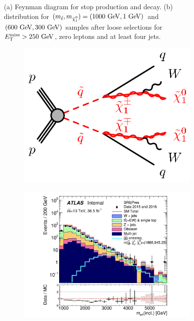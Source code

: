 \begin{figure}[h!]
\begin{center}
\begin{subfigure}[b]{0.45\textwidth}
                \caption{ }
    \end{subfigure}
\end{center}
\caption[Stop signal with $m_{\stop}-m_{\ninoone} >> m_t$ and SM background $\mtbmax$ distribution after loose preliminary selections for $\met>250 \gev$, zero leptons and at least four jets]{ (a) Feynman diagram for stop production and decay. (b) \mtbmax distribution for $(m_{\stop}, m_{\ninoone}) = (1000 \gev,1 \gev)$ and $(600 \gev, 300 \gev)$ samples after loose selections for $\met>250 \gev$, zero leptons and at least four jets.\cite{stop0LCONF} }
\label{fig:stopMtbmin} 
\end{figure}

\begin{figure}[h!]
  \begin{center}
    \begin{subfigure}[b]{0.30\textwidth}
        \includegraphics[width=\textwidth]{figures/feynDiag/gluino_onestep.png}%
                \caption{ }
    \end{subfigure}
    \begin{subfigure}[b]{0.45\textwidth}
        \includegraphics[width=\textwidth]{figures/strategy/gluino_meff.png}

\end{subfigure}
\end{center}
\end{figure}
